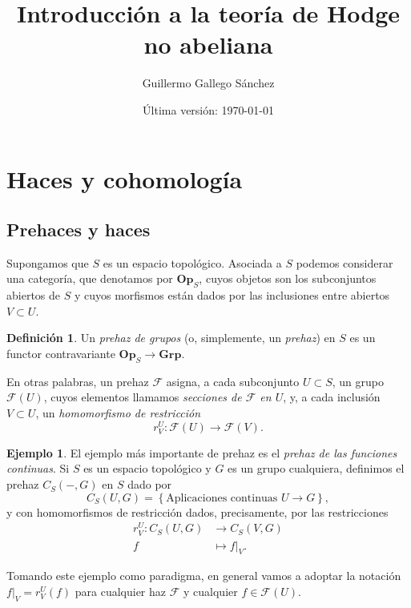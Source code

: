 \documentclass[12pt,a4paper]{article}
\title{Introducción a la teoría de Hodge no abeliana}
\author{Guillermo Gallego Sánchez}
\date{Última versión: \today}
\theoremstyle{definition} \newtheorem{defn}[thm]{Definición}
\theoremstyle{definition} \newtheorem{ejemplo}[thm]{Ejemplo}
\theoremstyle{definition} \newtheorem{ejercicio}[thm]{Ejercicio}
\def\FF{\mathscr{F}}
\def\Op{\mathbf{Op}}
\begin{document}
\maketitle
\section{Haces y cohomología}
\subsection{Prehaces y haces}
Supongamos que $S$ es un espacio topológico. Asociada a $S$ podemos considerar una categoría, que denotamos por $\Op_S$, cuyos objetos son los subconjuntos abiertos de $S$ y cuyos morfismos están dados por las inclusiones entre abiertos $V\subset U$.

\begin{defn}
  Un \emph{prehaz de grupos} (o, simplemente, un \emph{prehaz}) en $S$ es un functor contravariante $\Op_S \rightarrow \mathbf{Grp}$.
\end{defn}

En otras palabras, un prehaz $\FF$ asigna, a cada subconjunto $U\subset S$, un grupo $\FF(U)$, cuyos elementos llamamos \emph{secciones de $\FF$ en $U$}, y, a cada inclusión $V\subset U$, un \emph{homomorfismo de restricción} $$r^U_V:\FF(U) \rightarrow \FF(V).$$

\begin{ejemplo}
El ejemplo más importante de prehaz es el \emph{prehaz de las funciones continuas}. Si $S$ es un espacio topológico y $G$ es un grupo cualquiera, definimos el prehaz $C_S(-,G)$ en $S$ dado por
\begin{equation*}
  C_S(U,G) = \left\{ \text{Aplicaciones continuas } U\rightarrow G \right\},
\end{equation*}
y con homomorfismos de restricción dados, precisamente, por las restricciones
\begin{align*}
  r^U_V :C_S(U,G) &\longrightarrow C_S(V,G)\\ 
    f &\longmapsto f|_V. 
  \end{align*}
\end{ejemplo}

  Tomando este ejemplo como paradigma, en general vamos a adoptar la notación $f|_V= r^U_V(f)$ para cualquier haz $\FF$ y cualquier $f\in \FF(U)$.
\end{document}
